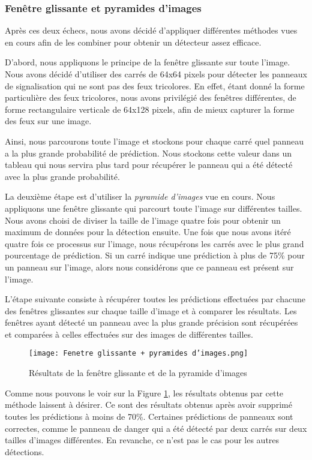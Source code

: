 \documentclass[twocolumn,10pt]{article}
\begin{document}
    \subsubsection{Fenêtre glissante et pyramides d'images}
    Après ces deux échecs, nous avons décidé d'appliquer différentes méthodes vues en cours afin de les combiner pour obtenir un détecteur assez efficace.

    D'abord, nous appliquons le principe de la fenêtre glissante sur toute l'image. Nous avons décidé d'utiliser des carrés de 64x64 pixels pour détecter les panneaux de signalisation qui ne sont pas des feux tricolores. En effet, étant donné la forme particulière des feux tricolores, nous avons privilégié des fenêtres différentes, de forme rectangulaire verticale de 64x128 pixels, afin de mieux capturer la forme des feux sur une image.

    Ainsi, nous parcourons toute l'image et stockons pour chaque carré quel panneau a la plus grande probabilité de prédiction. Nous stockons cette valeur dans un tableau qui nous servira plus tard pour récupérer le panneau qui a été détecté avec la plus grande probabilité.


    La deuxième étape est d'utiliser la \textit{pyramide d'images} vue en cours. Nous appliquons une fenêtre glissante qui parcourt toute l'image sur différentes tailles. Nous avons choisi de diviser la taille de l'image quatre fois pour obtenir un maximum de données pour la détection ensuite. Une fois que nous avons itéré quatre fois ce processus sur l'image, nous récupérons les carrés avec le plus grand pourcentage de prédiction. Si un carré indique une prédiction à plus de 75\% pour un panneau sur l'image, alors nous considérons que ce panneau est présent sur l'image.

    L'étape suivante consiste à récupérer toutes les prédictions effectuées par chacune des fenêtres glissantes sur chaque taille d'image et à comparer les résultats. Les fenêtres ayant détecté un panneau avec la plus grande précision sont récupérées et comparées à celles effectuées sur des images de différentes tailles.


    \begin{figure}
        \centering
        \texttt{[image: Fenetre glissante + pyramides d'images.png]}
        \caption{Résultats de la fenêtre glissante et de la pyramide d'images}
        \label{fig:fenetre-pyramide}
    \end{figure}

    Comme nous pouvons le voir sur la Figure \ref{fig:fenetre-pyramide}, les résultats obtenus par cette méthode laissent à désirer. Ce sont des résultats obtenus après avoir supprimé toutes les prédictions à moins de 70\%. Certaines prédictions de panneaux sont correctes, comme le panneau de danger qui a été détecté par deux carrés sur deux tailles d'images différentes. En revanche, ce n'est pas le cas pour les autres détections.
\end{document}
